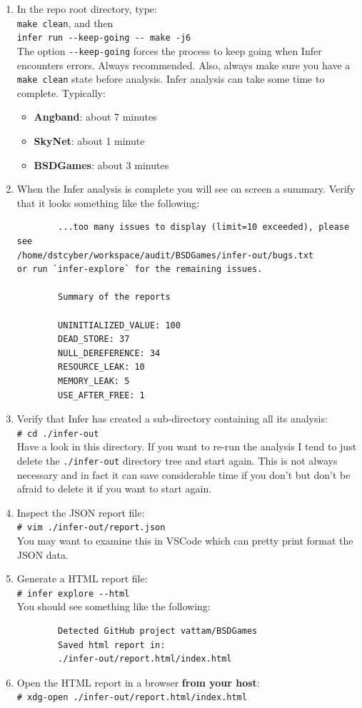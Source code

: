 \begin{enumerate}
	\itemsep0em
	\item In the repo root directory, type:\\
	\verb|make clean|, and then \\
	\verb|infer run --keep-going -- make -j6|\\
    The option \verb|--keep-going| forces the process to keep going when Infer encounters errors. Always recommended. Also, always make sure you have a \verb|make clean| state before analysis.    
    Infer analysis can take some time to complete. Typically:
    \begin{itemize}
    	\item \textbf{Angband}: about 7 minutes
    	\item \textbf{SkyNet}: about 1 minute
    	\item \textbf{BSDGames}: about 3 minutes
    \end{itemize}
	\item When the Infer analysis is complete you will see on screen a summary. 
	Verify that it looks something like the following:\\
	\begin{verbatim}		
		...too many issues to display (limit=10 exceeded), please see
/home/dstcyber/workspace/audit/BSDGames/infer-out/bugs.txt 
or run `infer-explore` for the remaining issues.
		
		Summary of the reports
		
		UNINITIALIZED_VALUE: 100
		DEAD_STORE: 37
		NULL_DEREFERENCE: 34
		RESOURCE_LEAK: 10
		MEMORY_LEAK: 5
		USE_AFTER_FREE: 1		
	\end{verbatim}
	\item Verify that Infer has created a sub-directory containing all its analysis:\\
	\verb|# cd ./infer-out|\\
	Have a look in this directory. If you want to re-run the analysis I tend to just 
	delete the \verb|./infer-out| directory tree and start again. This is not always necessary
	and in fact it can save considerable time if you don't but don't be afraid to delete it if you want 
	to start again.
	\item Inspect the JSON report file:\\
	\verb|# vim ./infer-out/report.json|\\
    You may want to examine this in VSCode which can pretty print format the JSON data. 
	\item Generate a HTML report file:\\
	\verb|# infer explore --html| \\
	You should see something like the following:
	\begin{verbatim}
		Detected GitHub project vattam/BSDGames
		Saved html report in:
		./infer-out/report.html/index.html
	\end{verbatim}
	\item Open the HTML report in a browser \textbf{from your host}:\\
	\verb|# xdg-open ./infer-out/report.html/index.html|
\end{enumerate}

